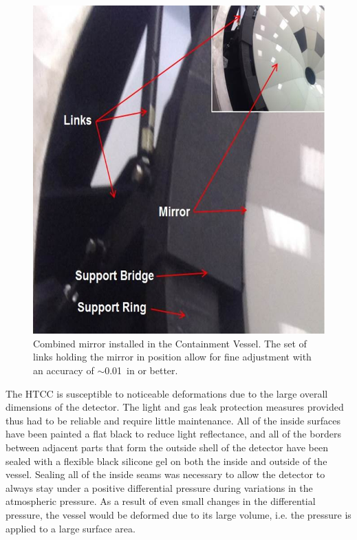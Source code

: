 \begin{figure}[ht]
    \centering
    \includegraphics[width=1.0\linewidth,trim={0 0cm 0 0},clip]{images/HTCC_MIRR_INST_NEW.jpg}
    \caption{Combined mirror installed in the Containment Vessel. The set of links holding the mirror in position
      allow for fine adjustment with an accuracy of $\sim$0.01~in or better.}
    \label{fig:HTCC_MIRR_INST_NEW}
\end{figure}

The HTCC is susceptible to noticeable deformations due to the large overall dimensions of the detector. The
light and gas leak protection measures provided thus had to be reliable and require little maintenance. All of
the inside surfaces have been painted a flat black to reduce light reflectance, and all of the borders between
adjacent parts that form the outside shell of the detector have been sealed with a flexible black silicone gel
on both the inside and outside of the vessel. Sealing all of the inside seams was necessary to allow the detector
to always stay under a positive differential pressure during variations in the atmospheric pressure. As a result
of even small changes in the differential pressure, the vessel would be deformed due to its large volume, i.e.
the pressure is applied to a large surface area. 

